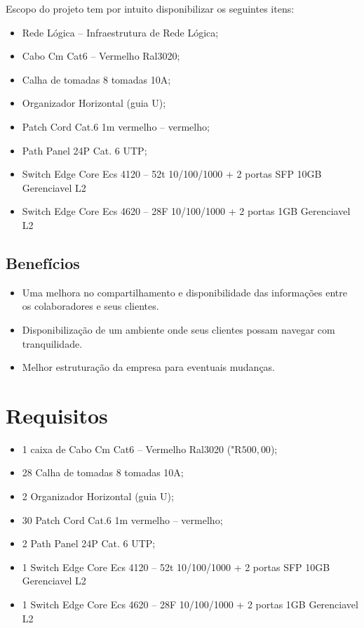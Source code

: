 \documentclass[	DIV=calc,%
							paper=a4,%
							fontsize=12pt,%
							onecolumn]{scrartcl}	 					%
\begin{document}
Escopo do projeto tem por intuito disponibilizar os seguintes itens:
\begin{itemize}
\item Rede Lógica – Infraestrutura de Rede Lógica;
\item Cabo Cm Cat6 – Vermelho Ral3020;
\item Calha de tomadas 8 tomadas 10A;
\item Organizador Horizontal (guia U);
\item Patch Cord Cat.6 1m vermelho – vermelho;
\item Path Panel 24P Cat. 6 UTP;
\item Switch Edge Core Ecs 4120 – 52t 10/100/1000 + 2 portas SFP 10GB Gerenciavel L2	
\item Switch Edge Core Ecs 4620 – 28F 10/100/1000 + 2 portas 1GB Gerenciavel L2
\end{itemize}
\subsection{Benefícios}
\begin{itemize}
 \item Uma melhora no compartilhamento e disponibilidade das informações entre os colaboradores e seus clientes.
\item Disponibilização de um ambiente onde seus clientes possam navegar com tranquilidade.
\item Melhor estruturação da empresa para eventuais mudanças.
\end{itemize}

\section{Requisitos}
\begin{itemize}

	\item 1 caixa de Cabo Cm Cat6 – Vermelho Ral3020 ("R$ 500,00$);
	\item 28 Calha de tomadas 8 tomadas 10A;
	\item 2 Organizador Horizontal (guia U);
	\item 30 Patch Cord Cat.6 1m vermelho – vermelho;
	\item 2 Path Panel 24P Cat. 6 UTP;
	\item 1 Switch Edge Core Ecs 4120 – 52t 10/100/1000 + 2 portas SFP 10GB Gerenciavel L2	
	\item 1 Switch Edge Core Ecs 4620 – 28F 10/100/1000 + 2 portas 1GB Gerenciavel L2
	
\end{itemize}	
\end{document}
